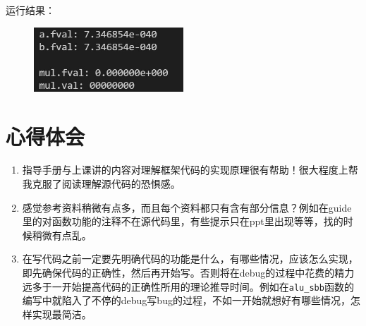 \documentclass[UTF8]{ctexart}
\begin{document}
运行结果：
\begin{figure}[H]
    \centering
    \includegraphics[width=0.5\textwidth]{assets/3.jpg}
\end{figure}

\section{心得体会}
\begin{enumerate}
    \item 指导手册与上课讲的内容对理解框架代码的实现原理很有帮助！很大程度上帮我克服了阅读理解源代码的恐惧感。
    \item 感觉参考资料稍微有点多，而且每个资料都只有含有部分信息？例如在guide里的对函数功能的注释不在源代码里，有些提示只在ppt里出现等等，找的时候稍微有点乱。
    \item 在写代码之前一定要先明确代码的功能是什么，有哪些情况，应该怎么实现，即先确保代码的正确性，然后再开始写。否则将在debug的过程中花费的精力远多于一开始提高代码的正确性所用的理论推导时间。例如在\verb|alu_sbb|函数的编写中就陷入了不停的debug写bug的过程，不如一开始就想好有哪些情况，怎样实现最简洁。
\end{enumerate}
\end{document}
